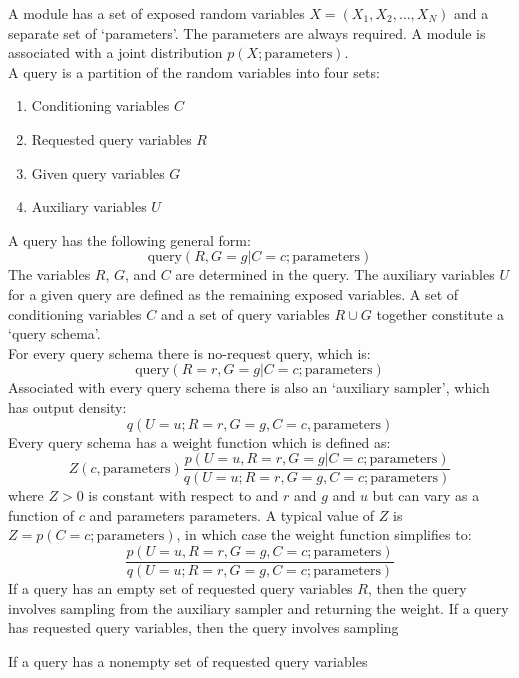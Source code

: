 \documentclass{article}
\begin{document}
\noindent A module has a set of exposed random variables $X = (X_1, X_2, \ldots, X_N)$ and a separate set of `parameters'.
The parameters are always required.
A module is associated with a joint distribution $p(X; \mbox{parameters})$.\\

\noindent A query is a partition of the random variables into four sets:
\begin{enumerate}
    \item Conditioning variables $C$
    \item Requested query variables $R$
    \item Given query variables $G$
    \item Auxiliary variables $U$ %
\end{enumerate}
A query has the following general form:
\begin{equation}
    \mbox{query}(R, G=g | C=c; \mbox{parameters})
\end{equation}
The variables $R$, $G$, and $C$ are determined in the query.
The auxiliary variables $U$ for a given query are defined as the remaining exposed variables.
A set of conditioning variables $C$ and a set of query variables $R \cup G$ together constitute a `query schema'.\\

\noindent For every query schema there is no-request query, which is:
\begin{equation}
    \mbox{query}(R=r, G=g | C=c; \mbox{parameters})
\end{equation}
Associated with every query schema there is also an `auxiliary sampler', which has output density:
\begin{equation}
    q(U=u; R=r, G=g, C=c, \mbox{parameters})
\end{equation}
Every query schema has a weight function which is defined as:
\begin{equation}
    Z(c, \mbox{parameters}) \frac{p(U=u, R=r, G=g| C=c; \mbox{parameters})}{q(U=u; R=r, G=g, C=c; \mbox{parameters})}
\end{equation}
where $Z > 0$ is constant with respect to and $r$ and $g$ and $u$ but can vary as a function of $c$ and parameters $\mbox{parameters}$.
A typical value of $Z$ is $Z = p(C = c; \mbox{parameters})$, in which case the weight function simplifies to:
\begin{equation}
    \frac{p(U=u, R=r, G=g, C=c; \mbox{parameters})}{q(U=u; R=r, G=g, C=c; \mbox{parameters})}
\end{equation}
If a query has an empty set of requested query variables $R$, then the query involves sampling from the auxiliary sampler and returning the weight.
If a query has requested query variables, then the query involves sampling 

If a query has a nonempty set of requested query variables 


\end{document}
